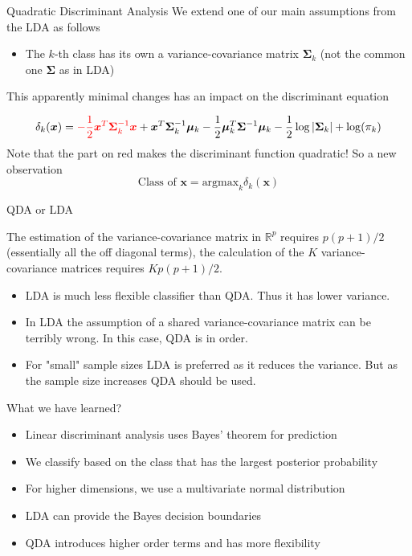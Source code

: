 \documentclass{beamer}
\begin{document}
\begin{frame}{Quadratic Discriminant Analysis}
	We extend one of our main assumptions from the LDA as follows
	
	\begin{itemize}
		\item The $k$-th class has its own a variance-covariance matrix $\bm{\Sigma}_k$ (not the common one $\bm{\Sigma}$ as in LDA)
	\end{itemize}
	This apparently minimal changes has an impact on the discriminant equation
	
	\begin{equation}
	\delta_k(\bm{x})= {\color{red} -\frac{1}{2}\bm{x}^T \bm{\Sigma}_k^{-1} \bm{x}}+       
	\bm{x}^T \bm{\Sigma}_k^{-1} \bm{\mu}_k - \frac{1}{2} \bm{\mu}_k^T \bm{\Sigma}^{-1}\bm{\mu}_k - \frac{1}{2} \log |\bm{\Sigma}_k| 
	+ \log(\pi_k)
	\end{equation}
Note that the part on red makes the discriminant function quadratic! 
So a new observation 
\begin{equation*}
		\textrm{Class of } \bm{x}=  \textrm{argmax}_k \delta_k(\bm{x})
\end{equation*}

\end{frame}

\begin{frame}{QDA or LDA}
	
	The estimation of the variance-covariance matrix in $\mathbb{R}^p$ requires $p (p+1)/2$ (essentially all the off diagonal terms), the calculation of the $K$ variance-covariance matrices requires $Kp(p+1)/2$. 
	\begin{itemize}
		\item LDA is much less flexible classifier than QDA. Thus it has lower variance.
		\item In LDA the assumption of a shared variance-covariance matrix can be terribly wrong. In this case, QDA is in order.
		\item For "small" sample sizes LDA is preferred as it reduces the variance. But as the sample size increases QDA should be used.
\end{itemize}
\end{frame}

\begin{frame}{What we have learned?	}
	\begin{itemize}
		\item Linear discriminant analysis uses Bayes' theorem for prediction
		\item We classify based on the class that has the largest posterior probability
		\item For higher dimensions, we use a multivariate normal distribution
		\item LDA can provide the Bayes decision boundaries
		\item QDA introduces higher order terms and has more flexibility
	\end{itemize}
\end{frame}
\end{document}
